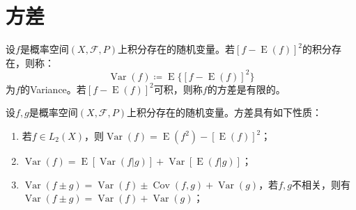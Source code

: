 \section{方差}

\begin{definition}
	设$f$是概率空间$(X,\mathscr{F},P)$上积分存在的随机变量。若$[f-\operatorname{E}(f)]^2$的积分存在，则称：
	\begin{equation*}
		\operatorname{Var}(f)\coloneq\operatorname{E}\{[f-\operatorname{E}(f)]^2\}
	\end{equation*}
	为$f$的\gls{Variance}。若$[f-\operatorname{E}(f)]^2$可积，则称$f$的方差是有限的。
\end{definition}
\begin{property}\label{prop:Variance}
	设$f,g$是概率空间$(X,\mathscr{F},P)$上积分存在的随机变量。方差具有如下性质：
	\begin{enumerate}
		\item 若$f\in L_2(X)$，则$\operatorname{Var}(f)=\operatorname{E}(f^2)-[\operatorname{E}(f)]^2$；
		\item $\operatorname{Var}(f)=\operatorname{E}[\operatorname{Var}(f|g)]+\operatorname{Var}[\operatorname{E}(f|g)]$；
		\item $\operatorname{Var}(f\pm g)=\operatorname{Var}(f)\pm\operatorname{Cov}(f,g)+\operatorname{Var}(g)$，若$f,g$不相关，则有$\operatorname{Var}(f\pm g)=\operatorname{Var}(f)+\operatorname{Var}(g)$；
	\end{enumerate}
\end{property}
